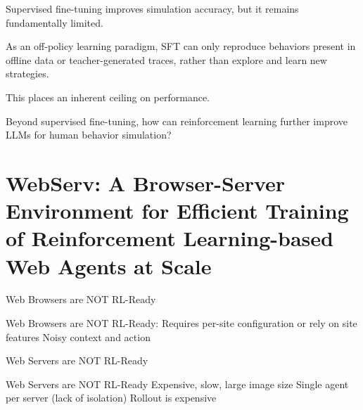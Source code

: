 \documentclass[scheme=plain,aspectratio=169]{beamer}
\begin{document}


\begin{frame}[c]
  Supervised fine-tuning improves simulation accuracy, but it remains fundamentally limited.

  As an off-policy learning paradigm, SFT can only reproduce behaviors present in offline data or teacher-generated traces, rather than explore and learn new strategies.

  This places an inherent ceiling on performance.

  Beyond supervised fine-tuning, how can reinforcement learning further improve LLMs for human behavior simulation?
\end{frame}

\section[WebServ: Browser-Server Environment for RL Web Agents]{WebServ: A Browser-Server Environment for Efficient Training of Reinforcement Learning-based Web Agents at Scale}


\begin{frame}{Web Browsers are NOT RL-Ready}
  \begin{outline}
    \1 Web Browsers are NOT RL-Ready:
      \2 Requires per-site configuration or rely on site features
      \2 Noisy context and action
  \end{outline}
\end{frame}

\begin{frame}{Web Servers are NOT RL-Ready}
  \begin{outline}
    \1 Web Servers are NOT RL-Ready
      \2 Expensive, slow, large image size
      \2 Single agent per server (lack of isolation)
      \2 Rollout is expensive
  \end{outline}
\end{frame}
\end{document}
